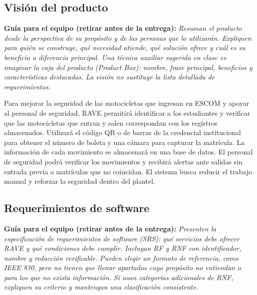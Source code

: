 \documentclass[12pt,letterpaper]{article}
\newcommand{\guia}[1]{\par\smallskip\noindent\textbf{Guía para el equipo (retirar antes de la entrega):} \textit{#1}\par\smallskip}
\begin{document}
\subsection{Visión del producto}
\guia{Resuman el producto desde la perspectiva de su propósito y de las personas que lo utilizarán. Expliquen para quién se construye, qué necesidad atiende, qué solución ofrece y cuál es su beneficio o diferencia principal. Una técnica auxiliar sugerida en clase es imaginar la caja del producto (Product Box): nombre, frase principal, beneficios y características destacadas. La visión no sustituye la lista detallada de requerimientos.}
Para mejorar la seguridad de las motocicletas que ingresan en ESCOM y apoyar al personal de seguridad, RAVE permitirá identificar a los estudiantes y verificar que las motocicletas que entran y salen correspondan con los registros almacenados. Utilizará el código QR o de barras de la credencial institucional para obtener el número de boleta y una cámara para capturar la matrícula. La información de cada movimiento se almacenará en una base de datos. El personal de seguridad podrá verificar los movimientos y recibirá alertas ante salidas sin entrada previa o matrículas que no coincidan. El sistema busca reducir el trabajo manual y reforzar la seguridad dentro del plantel.
\subsection{Requerimientos de software}
\guia{Presenten la especificación de requerimientos de software (SRS): qué servicios debe ofrecer RAVE y qué condiciones debe cumplir. Incluyan RF y RNF con identificador, nombre y redacción verificable. Pueden elegir un formato de referencia, como IEEE 830, pero no tienen que llenar apartados cuyo propósito no entiendan o para los que no exista información. Si usan categorías adicionales de RNF, expliquen su criterio y mantengan una clasificación consistente.}
\end{document}
